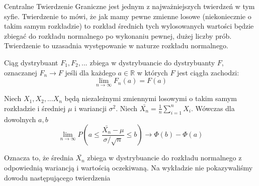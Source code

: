 Centralne Twierdzenie Graniczne jest jednym z najważniejszych twierdzeń w tym syfie.
Twierdzenie to mówi, że jak mamy pewne zmienne losowe (niekoniecznie o takim samym rozkładzie) to rozkład średnich tych wylosowanych wartości będzie zbiegać do rozkładu normalnego po wykonaniu pewnej, dużej liczby prób.
Twierdzenie to uzasadnia występowanie w naturze rozkładu normalnego.
\begin{definition}
    Ciąg dystrybuant \( F_1, F_2, ... \) zbiega w dystrybuancie do dystrybuanty \( F\), oznaczanej \(F_n \to F \) jeśli dla każdego \(a \in \mathbb{R} \) w których \( F \) jest ciągła zachodzi:
    \[
        \lim_{n \to \infty} F_n(a) = F(a)
    \]
\end{definition}

\begin{theorem}[CTG]
    Niech \( X_1, X_2, ... X_n\) będą niezależnymi zmiennymi losowymi o takim samym rozkładzie i średniej \( \mu\) i wariancji \( \sigma^2\). Niech \( \bar{X_n} = \frac{1}{n}\sum_{i=1}^n X_i \). Wówczas dla dowolnych \(a, b\)
    \[
        \lim_{n \to \infty} P \left( a \leq \frac{ \bar{X_n} - \mu}{\sigma/\sqrt{n}} \leq b \right) \to \Phi(b) - \Phi(a)
    \]
\end{theorem}
    Oznacza to, że średnia \( \bar{X_n}\) zbiega w dystrybuancie do rozkładu normalnego z odpowiednią wariancją i wartością oczekiwaną.
    Na wykładzie nie pokazywaliśmy dowodu następującego twierdzenia
    
